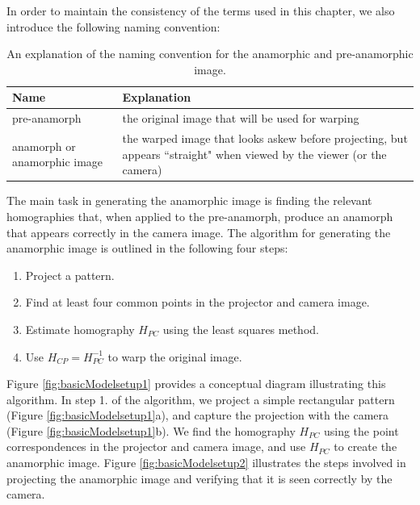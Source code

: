 \documentclass[11pt, oneside, reqno]{book}
\begin{document}



In order to maintain the consistency of the terms used in this chapter, we also introduce the following naming convention:

\begin{table}[ht]
	\renewcommand{\arraystretch}{1.3}
	\begin{center}
		\begin{tabular}{| p{2.4 cm} | p{10.2 cm} |}
			\hline
			\textbf{Name} & \textbf{Explanation} \\
			\hline
			pre-anamorph & the original image that will be used for warping\\
			\hline
			anamorph or anamorphic image & the warped image that looks askew before projecting, but appears ``straight" when viewed by the viewer (or the camera) \\
			\hline
		\end{tabular}
	\end{center}
	\caption{An explanation of the naming convention for the anamorphic and pre-anamorphic image.}
	\label{table:basicModelpreAndAnamorph}
\end{table}

The main task in generating the anamorphic image is finding the relevant homographies that, when applied to the pre-anamorph, produce an anamorph that appears correctly in the camera image. The algorithm for generating the anamorphic image is outlined in the following four steps:
\begin{enumerate} %
\item Project a pattern.
\item Find at least four common points in the projector and camera image.
\item Estimate homography $H_{PC}$ using the least squares method.
\item Use $H_{CP} = H_{PC}^{-1}$ to warp the original image.
\end{enumerate}



Figure \ref{fig:basicModelsetup1} provides a conceptual diagram illustrating this algorithm. In step 1. of the algorithm, we project a simple rectangular pattern (Figure \ref{fig:basicModelsetup1}a), and capture the projection with the camera (Figure \ref{fig:basicModelsetup1}b). We find the homography $H_{PC}$ using the point correspondences in the projector and camera image, and use $H_{PC}$ to create the anamorphic image.
Figure \ref{fig:basicModelsetup2} illustrates the steps involved in projecting the anamorphic image and verifying that it is seen correctly by the camera.
\end{document}
